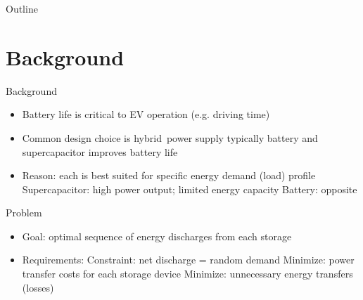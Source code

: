 \documentclass{beamer}
\title{}
\author{Alok Deshpande}
\date{February 7, 2017}
\begin{document}
	
	\begin{frame}
	\titlepage
\end{frame}

\begin{frame}{Outline}
\tableofcontents
\end{frame}

\section{Background}
\begin{frame}{Background}
	\begin{itemize}
		\item Battery life is critical to EV operation (e.g. driving time)
		\item Common design choice is hybrid power supply %
		\subitem typically battery and supercapacitor
		\subitem improves battery life
		\item Reason: each is best suited for specific energy demand (load) profile %
		\subitem Supercapacitor: high power output; limited energy capacity
		\subitem Battery: opposite
	\end{itemize}
\end{frame}
\begin{frame}{Problem}
	\begin{itemize}
		\item Goal: optimal sequence of energy discharges from each storage
		\item Requirements:
		\subitem Constraint: net discharge = random demand
		\subitem Minimize: power transfer costs for each storage device
		\subitem Minimize: unnecessary energy transfers (losses)
	\end{itemize}
\end{frame}
\end{document}
